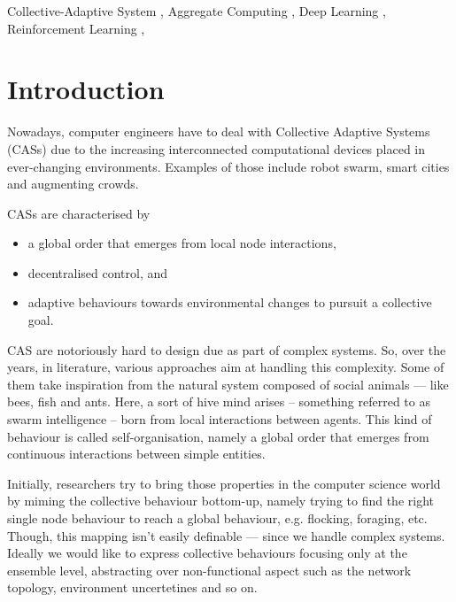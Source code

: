 \documentclass[
  twocolumn,
]{ceurart}
\begin{document}
\begin{keywords}
  Collective-Adaptive System \sep
  Aggregate Computing \sep
  Deep Learning \sep
  Reinforcement Learning \sep
\end{keywords}



\maketitle
{}
\section{Introduction}
Nowadays, computer engineers have to deal with Collective Adaptive Systems (CASs)
 due to the increasing interconnected computational devices placed in ever-changing environments.
 Examples of those include robot swarm, smart cities and augmenting crowds.

CASs are characterised by 
\begin{itemize}
\item a global order that emerges from local node interactions, 
\item  decentralised control, and 
\item adaptive behaviours towards environmental changes to pursuit a collective goal.
\end{itemize}
CAS are notoriously hard to design due as part of complex systems. 
%
So, over the years, in literature, various approaches aim at handling this complexity. 
%
Some of them take inspiration from the natural system
 composed of social animals --- like bees, fish and ants. 
%
Here, a sort of hive mind arises -- 
 something referred to as swarm intelligence -- 
born from local interactions between agents. 
%
This kind of behaviour is called self-organisation, 
 namely a global order that emerges from continuous 
 interactions between simple entities.

Initially, researchers try to bring those properties in the computer science world 
 by miming the collective behaviour bottom-up, 
 namely trying to find the right single node behaviour 
 to reach a global behaviour, e.g. flocking, foraging, etc.
%
Though, this mapping isn't easily definable ---
 since we handle complex systems.
%
Ideally we would like to express collective behaviours focusing only at the ensemble level,
 abstracting over non-functional aspect such as the network topology, environment uncertetines and 
 so on.
\end{document}
